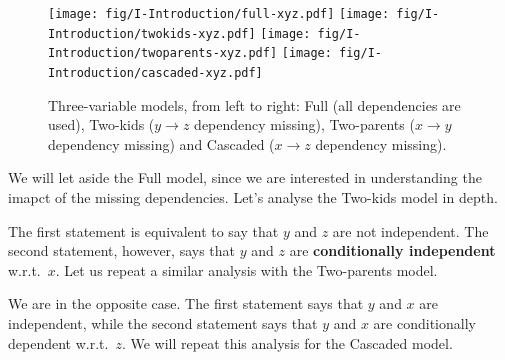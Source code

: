 \begin{figure}[H]
\centering
\texttt{[image: fig/I-Introduction/full-xyz.pdf]}\hspace{1cm}
\texttt{[image: fig/I-Introduction/twokids-xyz.pdf]}\hspace{1cm}
\texttt{[image: fig/I-Introduction/twoparents-xyz.pdf]}\hspace{1cm}
\texttt{[image: fig/I-Introduction/cascaded-xyz.pdf]}
\caption{Three-variable models, from left to right: Full (all dependencies are used), Two-kids ($y\rightarrow z$ dependency missing), Two-parents ($x\rightarrow y$ dependency missing) and Cascaded ($x\rightarrow z$ dependency missing).\label{fig:3-var-models}}
\end{figure}

We will let aside the Full model, since we are interested in understanding the imapct of the missing dependencies. Let's analyse the Two-kids model in depth.\vspace{3mm}

\vspace{2mm}

The first statement is equivalent to say that $y$ and $z$ are not independent. The second statement, however, says that $y$ and $z$ are \textbf{conditionally independent} w.r.t.\ $x$. Let us repeat a similar analysis with the Two-parents model.\vspace{2mm}

\vspace{2mm}

We are in the opposite case. The first statement says that $y$ and $x$ are independent, while the second statement says that $y$ and $x$ are conditionally dependent w.r.t.\ $z$. We will repeat this analysis for the Cascaded model.\vspace{2mm}

\vspace{2mm}


